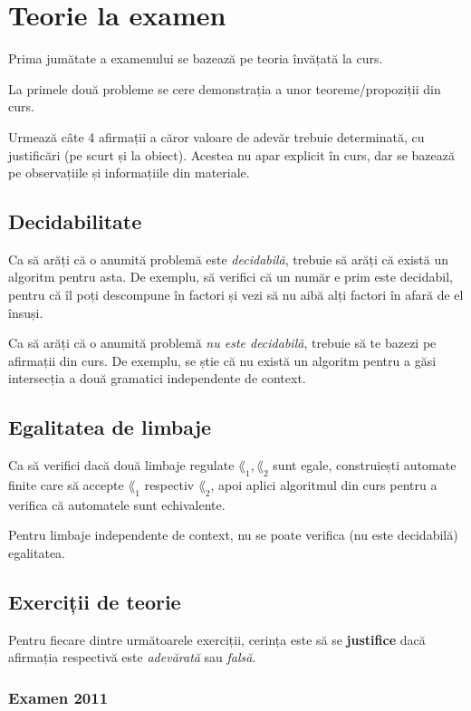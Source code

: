 \section*{Teorie la examen}

Prima jumătate a examenului se bazează pe teoria învățată la curs.

La primele două probleme se cere demonstrația a unor teoreme/propoziții din curs.

Urmează câte 4 afirmații a căror valoare de adevăr trebuie determinată, cu justificări (pe scurt și la obiect). Acestea nu apar explicit în curs, dar se bazează pe observațiile și informațiile din materiale.

\subsection*{Decidabilitate}

Ca să arăți că o anumită problemă este \emph{decidabilă}, trebuie să arăți că există un algoritm pentru asta. De exemplu, să verifici că un număr e prim este decidabil, pentru că îl poți descompune în factori și vezi să nu aibă alți factori în afară de el însuși.

Ca să arăți că o anumită problemă \emph{nu este decidabilă}, trebuie să te bazezi pe afirmații din curs. De exemplu, se știe că nu există un algoritm pentru a găsi intersecția a două gramatici independente de context.

\subsection*{Egalitatea de limbaje}

Ca să verifici dacă două limbaje regulate \(\lang_1, \lang_2\) sunt egale, construiești automate finite care să accepte \(\lang_1\) respectiv \(\lang_2\), apoi aplici algoritmul din curs pentru a verifica că automatele sunt echivalente.

Pentru limbaje independente de context, nu se poate verifica (nu este decidabilă) egalitatea.

\subsection*{Exerciții de teorie}

Pentru fiecare dintre următoarele exerciții, cerința este să se \textbf{justifice} dacă afirmația respectivă este \emph{adevărată} sau \emph{falsă}.

\subsubsection*{Examen 2011}

